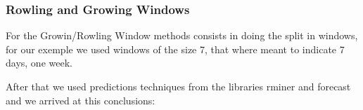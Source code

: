 \subsubsection{Rowling and Growing Windows}


\quad For the Growin/Rowling Window methods consists in doing the split in windows, for our exemple we used windows of the size 7, that where meant to indicate 7 days, one week.

After that we used predictions techniques from the libraries rminer and forecast and we arrived at this conclusions: